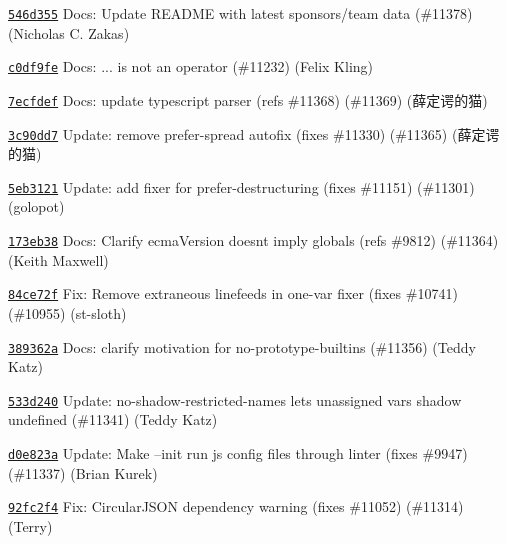 \begin{DoxyItemize}
\item \href{https://github.com/eslint/eslint/commit/546d355ace65631e27de859baea3ffcc50e0ad2c}{\texttt{ {\ttfamily 546d355}}} Docs\+: Update R\+E\+A\+D\+ME with latest sponsors/team data (\#11378) (Nicholas C. Zakas)
\item \href{https://github.com/eslint/eslint/commit/c0df9febb7c7e045ababc10b88dbcbb3f28c724c}{\texttt{ {\ttfamily c0df9fe}}} Docs\+: {\ttfamily ...} is not an operator (\#11232) (Felix Kling)
\item \href{https://github.com/eslint/eslint/commit/7ecfdefaeadb772f8b96ffe37c4a2c97fde0da16}{\texttt{ {\ttfamily 7ecfdef}}} Docs\+: update typescript parser (refs \#11368) (\#11369) (薛定谔的猫)
\item \href{https://github.com/eslint/eslint/commit/3c90dd7e25cf97833deddb11cfbc107a5663ac08}{\texttt{ {\ttfamily 3c90dd7}}} Update\+: remove prefer-\/spread autofix (fixes \#11330) (\#11365) (薛定谔的猫)
\item \href{https://github.com/eslint/eslint/commit/5eb3121b82c1837da0c3021b7d9384bb30832e36}{\texttt{ {\ttfamily 5eb3121}}} Update\+: add fixer for {\ttfamily prefer-\/destructuring} (fixes \#11151) (\#11301) (golopot)
\item \href{https://github.com/eslint/eslint/commit/173eb38cdb3e4673cba947521f27158828186d77}{\texttt{ {\ttfamily 173eb38}}} Docs\+: Clarify ecma\+Version doesn\textquotesingle{}t imply globals (refs \#9812) (\#11364) (Keith Maxwell)
\item \href{https://github.com/eslint/eslint/commit/84ce72fdeba082b7b132e4ac6b714fb1a93831b7}{\texttt{ {\ttfamily 84ce72f}}} Fix\+: Remove extraneous linefeeds in {\ttfamily one-\/var} fixer (fixes \#10741) (\#10955) (st-\/sloth)
\item \href{https://github.com/eslint/eslint/commit/389362a06ac6601512b872d3e843c7371f2a1bcc}{\texttt{ {\ttfamily 389362a}}} Docs\+: clarify motivation for no-\/prototype-\/builtins (\#11356) (Teddy Katz)
\item \href{https://github.com/eslint/eslint/commit/533d240b0811f663494cb213b06cc9e51e1ff2d0}{\texttt{ {\ttfamily 533d240}}} Update\+: no-\/shadow-\/restricted-\/names lets unassigned vars shadow undefined (\#11341) (Teddy Katz)
\item \href{https://github.com/eslint/eslint/commit/d0e823aef196a6564c87a78b72c1ef980ce67af9}{\texttt{ {\ttfamily d0e823a}}} Update\+: Make --init run js config files through linter (fixes \#9947) (\#11337) (Brian Kurek)
\item \href{https://github.com/eslint/eslint/commit/92fc2f4f3faf8aeaae8a8e71db0de405404fb6c3}{\texttt{ {\ttfamily 92fc2f4}}} Fix\+: Circular\+J\+S\+ON dependency warning (fixes \#11052) (\#11314) (Terry)

\end{DoxyItemize}
